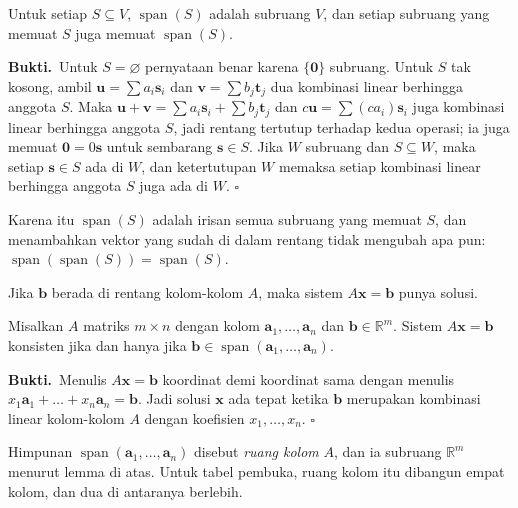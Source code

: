 \begin{lemma}
Untuk setiap $S\subseteq V$, $\operatorname{span}(S)$ adalah subruang $V$, dan setiap
subruang yang memuat $S$ juga memuat $\operatorname{span}(S)$.
\end{lemma}

\par\medskip\noindent\textbf{Bukti.}\ 
Untuk $S=\varnothing$ pernyataan benar karena $\{\mathbf{0}\}$ subruang. Untuk $S$ tak
kosong, ambil $\mathbf{u}=\sum a_{i}\mathbf{s}_{i}$ dan $\mathbf{v}=\sum b_{j}\mathbf{t}_{j}$
dua kombinasi linear berhingga anggota $S$. Maka
$\mathbf{u}+\mathbf{v}=\sum a_{i}\mathbf{s}_{i}+\sum b_{j}\mathbf{t}_{j}$ dan
$c\mathbf{u}=\sum (ca_{i})\mathbf{s}_{i}$ juga kombinasi linear berhingga anggota $S$, jadi
rentang tertutup terhadap kedua operasi; ia juga memuat $\mathbf{0}=0\mathbf{s}$ untuk
sembarang $\mathbf{s}\in S$. Jika $W$ subruang dan $S\subseteq W$, maka setiap
$\mathbf{s}\in S$ ada di $W$, dan ketertutupan $W$ memaksa setiap kombinasi linear berhingga
anggota $S$ juga ada di $W$.
\hfill$\square$\par\medskip

Karena itu $\operatorname{span}(S)$ adalah irisan semua subruang yang memuat $S$, dan
menambahkan vektor yang sudah di dalam rentang tidak mengubah apa pun:
$\operatorname{span}(\operatorname{span}(S))=\operatorname{span}(S)$.

Jika $\mathbf{b}$ berada di rentang kolom-kolom $A$, maka sistem $A\mathbf{x}=\mathbf{b}$
punya solusi.

\begin{proposisi}
Misalkan $A$ matriks $m\times n$ dengan kolom $\mathbf{a}_{1},\dots,\mathbf{a}_{n}$ dan
$\mathbf{b}\in\mathbb{R}^{m}$. Sistem $A\mathbf{x}=\mathbf{b}$ konsisten jika dan hanya jika
$\mathbf{b}\in\operatorname{span}(\mathbf{a}_{1},\dots,\mathbf{a}_{n})$.
\end{proposisi}

\par\medskip\noindent\textbf{Bukti.}\ 
Menulis $A\mathbf{x}=\mathbf{b}$ koordinat demi koordinat sama dengan menulis
$x_{1}\mathbf{a}_{1}+\dots+x_{n}\mathbf{a}_{n}=\mathbf{b}$. Jadi solusi $\mathbf{x}$ ada
tepat ketika $\mathbf{b}$ merupakan kombinasi linear kolom-kolom $A$ dengan koefisien
$x_{1},\dots,x_{n}$.
\hfill$\square$\par\medskip

Himpunan $\operatorname{span}(\mathbf{a}_{1},\dots,\mathbf{a}_{n})$ disebut
\emph{ruang kolom} $A$, dan ia subruang $\mathbb{R}^{m}$ menurut lemma di atas. Untuk tabel
pembuka, ruang kolom itu dibangun empat kolom, dan dua di antaranya berlebih.

